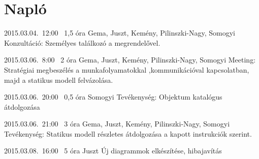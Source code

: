 %
\section{Napló}

\begin{naplo}
	
\bejegyzes
{2015.03.04.~12:00~} %
{1,5 óra} %
{Gema, Juszt, Kemény, Pilinszki-Nagy, Somogyi} %
{Konzultáció: Személyes találkozó a megrendelővel.} %

\bejegyzes
{2015.03.06.~8:00~} %
{2 óra} %
{Gema, Juszt, Kemény, Pilinszki-Nagy, Somogyi} %
{Meeting: Stratégiai megbeszélés a munkafolyamatokkal ,kommunikációval kapcsolatban, majd a statikus modell felvázolása.} %

\bejegyzes
{2015.03.06.~20:00~} %
{0,5 óra} %
{Somogyi} %
{Tevékenység: Objektum katalógus átdolgozása} %

\bejegyzes
{2015.03.06.~21:00~}
{3 óra}
{Gema, Juszt, Kemény, Pilinszki-Nagy, Somogyi}
{Tevékenység: Statikus modell részletes átdolgozása a kapott instrukciók szerint.}

\bejegyzes
{2015.03.08.~16:00~} %
{5 óra} %
{Juszt} %
{Új diagrammok elkészítése, hibajavítás} %



\end{naplo}

